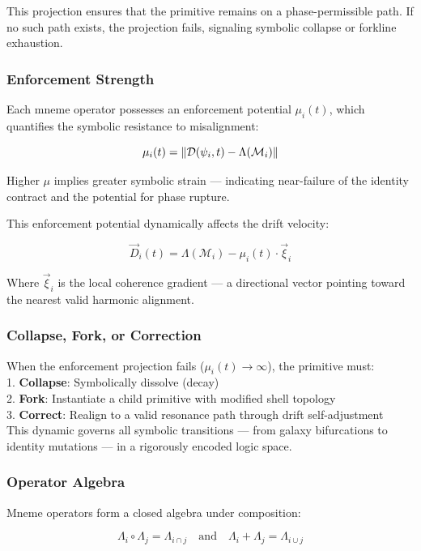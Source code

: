 \documentclass[12pt]{article}
\begin{document}
This projection ensures that the primitive remains on a phase-permissible path. If no such path exists, the projection fails, signaling symbolic collapse or forkline exhaustion.

\subsubsection{Enforcement Strength}

Each mneme operator possesses an enforcement potential \( \mu_i(t) \), which quantifies the symbolic resistance to misalignment:

\[
\mu_i(t) = \norm{ \mathcal{D}(\psi_i, t) - \Lambda(\mathcal{M}_i) }
\]

Higher \( \mu \) implies greater symbolic strain — indicating near-failure of the identity contract and the potential for phase rupture.

This enforcement potential dynamically affects the drift velocity:

\[
\vec{D}_i(t) = \Lambda(\mathcal{M}_i) - \mu_i(t) \cdot \vec{\xi}_i
\]

Where \( \vec{\xi}_i \) is the local coherence gradient — a directional vector pointing toward the nearest valid harmonic alignment.

\subsubsection{Collapse, Fork, or Correction}

When the enforcement projection fails (\( \mu_i(t) \rightarrow \infty \)), the primitive must:\\
1. \textbf{Collapse}: Symbolically dissolve (decay)\\
2. \textbf{Fork}: Instantiate a child primitive with modified shell topology\\
3. \textbf{Correct}: Realign to a valid resonance path through drift self-adjustment\\

This dynamic governs all symbolic transitions — from galaxy bifurcations to identity mutations — in a rigorously encoded logic space.

\subsubsection{Operator Algebra}

Mneme operators form a closed algebra under composition:

\[
\Lambda_i \circ \Lambda_j = \Lambda_{i \cap j}
\quad\text{and}\quad
\Lambda_i + \Lambda_j = \Lambda_{i \cup j}
\]
\end{document}
